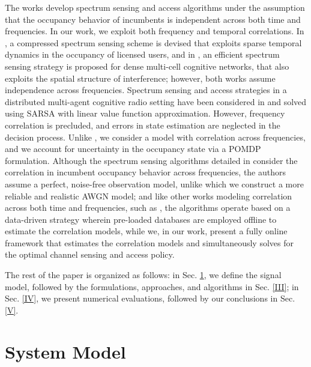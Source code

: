 \documentclass[10pt,twocolumn]{IEEEtran}
\begin{document}
The works \cite{7094730, 7895211} develop spectrum sensing and access algorithms under the assumption that the occupancy behavior of incumbents is independent across both time and frequencies. In our work, we exploit both frequency and temporal correlations. In \cite{7336513}, a compressed spectrum sensing scheme is devised that exploits sparse temporal dynamics in the occupancy of licensed users, and in \cite{8571293}, an efficient spectrum sensing strategy is proposed for dense multi-cell cognitive networks, that also exploits the spatial structure of interference; however, both works assume independence across frequencies. Spectrum sensing and access strategies in a distributed multi-agent cognitive radio setting have been considered in \cite{6507570} and solved using SARSA with linear value function approximation. However, frequency correlation is precluded, and errors in state estimation are neglected in the decision process. Unlike \cite{6507570}, we consider a model with correlation across frequencies, and we account for uncertainty in the occupancy state via a POMDP formulation. Although the spectrum sensing algorithms detailed in \cite{6956794} consider the correlation in incumbent occupancy behavior across frequencies, the authors assume a perfect, noise-free observation model, unlike which we construct a more reliable and realistic AWGN model; and like other works modeling correlation across both time and frequencies, such as \cite{4554696}, the algorithms operate based on a  data-driven strategy wherein pre-loaded databases are employed offline to estimate the correlation models, while we, in our work, present a fully online framework that estimates the correlation models and simultaneously solves for the optimal channel sensing and access policy.

The rest of the paper is organized as follows: in Sec. \ref{II}, we define the signal model, followed by the formulations, approaches, and algorithms in Sec. \ref{III}; in Sec. \ref{IV}, we present numerical evaluations, followed by our conclusions in Sec. \ref{V}.
\section{System Model}\label{II}
\end{document}
